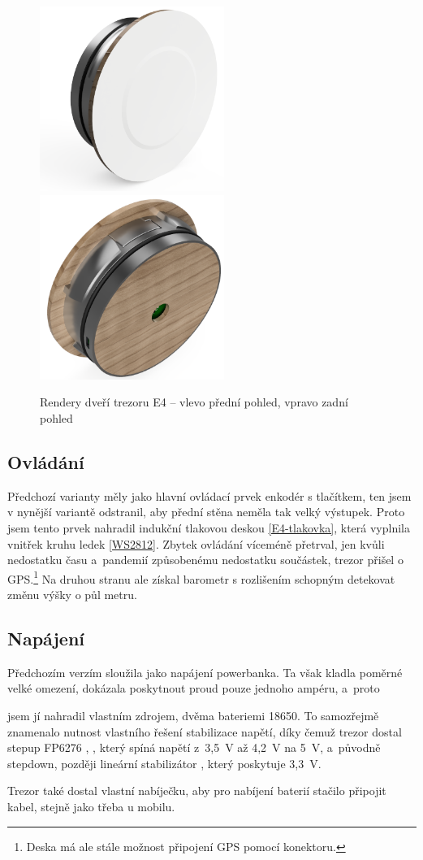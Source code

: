 \begin{figure}[htbp]
    \centering
    \includegraphics[width=170pt]{kapitoly/obrazky/E4/predni_render.png}
    \includegraphics[width=170pt]{kapitoly/obrazky/E4/zadni_render.png}
    \caption{Rendery dveří trezoru E4 -- vlevo přední pohled, vpravo zadní pohled \centering}
    \label{fig:E4-render}
\end{figure}

\subsection*{Ovládání}
Předchozí varianty měly jako hlavní ovládací prvek enkodér s tlačítkem, ten jsem v nynější variantě odstranil, aby přední stěna neměla tak velký 
výstupek. Proto jsem tento prvek nahradil indukční tlakovou deskou \ref{E4-tlakovka}, která vyplnila vnitřek kruhu ledek \ref{WS2812}. 
Zbytek ovládání víceméně přetrval, jen kvůli nedostatku času a~pandemií způsobenému nedostatku součástek, trezor přišel o GPS.\footnote{Deska má ale stále možnost připojení GPS pomocí konektoru.}
Na druhou stranu ale získal barometr s rozlišením schopným detekovat změnu výšky o půl metru.

\subsection*{Napájení}
Předchozím verzím sloužila jako napájení powerbanka. Ta však kladla poměrné velké omezení, dokázala poskytnout proud pouze jednoho ampéru, a~proto 

jsem jí nahradil vlastním zdrojem, dvěma bateriemi 18650. 
To samozřejmě znamenalo nutnost vlastního řešení stabilizace napětí, díky čemuž trezor dostal stepup FP6276 \parencite{fp6276a}, , 
který spíná napětí z~3,5~V až 4,2~V na 5~V, a~původně stepdown, později lineární stabilizátor , který poskytuje 3,3~V. 

Trezor také dostal vlastní nabíječku, aby pro nabíjení baterií stačilo připojit kabel, stejně jako třeba u mobilu.
